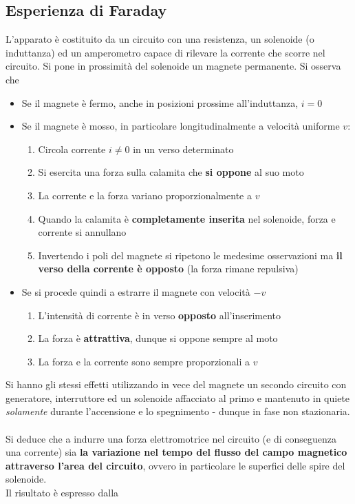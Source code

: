 \subsection{Esperienza di Faraday}
L'apparato è costituito da un circuito con una resistenza, un solenoide (o induttanza) ed un amperometro capace di rilevare la corrente che scorre nel circuito. Si pone in prossimità del solenoide un magnete permanente. Si osserva che
\begin{itemize}
	\item Se il magnete è fermo, anche in posizioni prossime all'induttanza, $i = 0$
	\item Se il magnete è mosso, in particolare longitudinalmente a velocità uniforme $v$:
	\begin{enumerate}
		\item Circola corrente $i \neq 0$ in un verso determinato 
		\item Si esercita una forza sulla calamita che \textbf{si oppone} al suo moto
		\item La corrente e la forza variano proporzionalmente a $v$
		\item Quando la calamita è \textbf{completamente inserita} nel solenoide, forza e corrente si annullano
		\item Invertendo i poli del magnete si ripetono le medesime osservazioni ma \textbf{il verso della corrente è opposto} (la forza rimane repulsiva)
	\end{enumerate}
	\item Se si procede quindi a estrarre il magnete con velocità $-v$
	\begin{enumerate}
		\item L'intensità di corrente è in verso \textbf{opposto} all'inserimento
		\item La forza è \textbf{attrattiva}, dunque si oppone sempre al moto
		\item La forza e la corrente sono sempre proporzionali a $v$
	\end{enumerate}
\end{itemize}

Si hanno gli stessi effetti utilizzando in vece del magnete un secondo circuito con generatore, interruttore ed un solenoide affacciato al primo e mantenuto in quiete \textit{solamente} durante l'accensione e lo spegnimento - dunque in fase non stazionaria. 
\\~\\Si deduce che a indurre una forza elettromotrice nel circuito (e di conseguenza una corrente) sia \textbf{la variazione nel tempo del flusso del campo magnetico attraverso l'area del circuito}, ovvero in particolare le superfici delle spire del solenoide. 
\\Il risultato è espresso dalla

